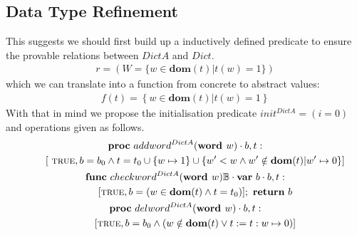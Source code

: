 \documentclass[a4paper,12pt,fleqn]{scrartcl}
\newcommand{\domt}{\textbf{dom}(t)}
\newcommand{\WORD}{\textbf{word }}
\begin{document}
\subsection{Data Type Refinement}
This suggests we should first build up a inductively defined predicate to ensure
 the provable relations between
$DictA$ and $Dict$.
\begin{gather*}
    r = (W = 
    \{ 
        w \in \domt| t(w)=1
    \})
\end{gather*}
which we can translate into a function from concrete to abstract values:
\begin{gather*}
    f(t) = 
    \left\{
        w \in  \domt | t(w) = 1
    \right\}
\end{gather*}
With that in mind we propose the initialisation predicate 
$init^{DictA} = (i = 0)$ and operations given as follows.
\begin{gather*}
    \PROC\ addword^{DictA}(\WORD w)\cdot b, t:\\
        \qquad [ \ \True, b = b_0\And t = t_0\cup \{w\mapsto 1\}\cup 
        \{
            w' < w \And w' \notin \domt | w' \mapsto 0
        \}]\\
    \FUNC\ checkword^{DictA}(\WORD w) \mathbb{B}\cdot
        \VAR\ b\cdot b, t:\\
        \qquad[\True, b = (w\in \domt\And t = t_0)];\ \RETURN\ b\\
    \PROC\ delword^{DictA}(\WORD w)\cdot b, t:\\
        \qquad[\True , b = b_0\And
        (w \notin \domt \OR t\Ass t: w \mapsto 0)]\\ 
\end{gather*} 
\end{document}
